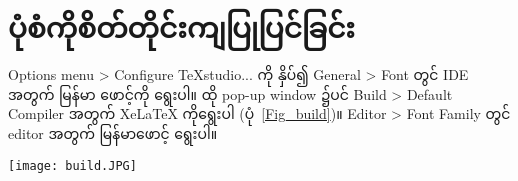 \chapter{ပုံစံကိုစိတ်တိုင်းကျပြုပြင်ခြင်း}
\label{ch:description}
Options menu > Configure TeXstudio... ကို နှိပ်၍ General > Font တွင် IDE အတွက် မြန်မာ ဖောင့်ကို ရွေးပါ။
ထို pop-up window ၌ပင် Build > Default Compiler အတွက် XeLaTeX ကိုရွေးပါ (ပုံ~\ref{Fig_build})။
Editor > Font Family တွင် editor အတွက် မြန်မာဖောင့် ရွေးပါ။

\begin{figure*}[htbp!]
	\centering
	\texttt{[image: build.JPG]}
	\caption{Build အတွက် XeLaTeX ကို ရွေးခြင်း။}
	\label{Fig_build}
\end{figure*}


